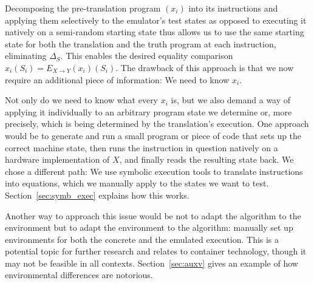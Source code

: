 Decomposing the pre-translation program $(x_i)$ into its instructions and applying them selectively to the emulator's
test states as opposed to executing it natively on a semi-random starting state thus allows us to use the same starting
state for both the translation and the truth program at each instruction, eliminating $\Delta_S$. This enables the
desired equality comparison $x_i(S_i) = E_{X \rightarrow Y}(x_i)(S_i)$. The drawback of this approach is that we now
require an additional piece of information: We need to know $x_i$.

Not only do we need to know what every $x_i$ is, but we also demand a way of applying it individually to an arbitrary
program state we determine or, more precisely, which is being determined by the translation's execution. One approach
would be to generate and run a small program or piece of code that sets up the correct machine state, then runs the
instruction in question natively on a hardware implementation of $X$, and finally reads the resulting state back. We
chose a different path: We use symbolic execution tools to translate instructions into equations, which we manually
apply to the states we want to test. Section~\ref{sec:symb_exec} explains how this works.

Another way to approach this issue would be not to adapt the algorithm to the environment but to adapt the environment
to the algorithm: manually set up environments for both the concrete and the emulated execution. This is a potential
topic for further research and relates to container technology, though it may not be feasible in all contexts.
Section~\ref{sec:auxv} gives an example of how environmental differences are notorious.

